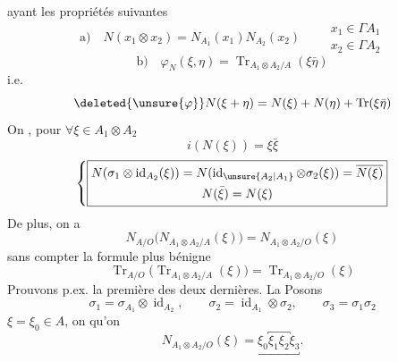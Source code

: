 ayant les propriétés suivantes
\[
\text{a)}\quad N(x_1\otimes x_2)=N_{A_1}(x_1)N_{A_2}(x_2)
\qquad\begin{gathered}x_1\in\Gamma A_1\\x_2\in\Gamma A_2\end{gathered}
\]
\[
\text{b)}\quad \varphi_N(\xi,\eta)=\operatorname{Tr}_{A_1\otimes A_2/A}(\xi\bar\eta)
\]
i.e.
\[
 \deleted{\unsure{\varphi}}N(\xi+\eta)=N(\xi)+N(\eta)+\operatorname{Tr}(\xi\bar\eta)
\]
On , pour $\forall\xi\in A_1\otimes A_2$
\[
 \boxed{i(N(\xi))=\xi\bar\xi}
\]
\[
\left\{\boxed{\begin{gathered}
 N(\sigma_1\otimes\operatorname{id}_{A_2}(\xi))=N(\operatorname{id}_{\unsure{A_2|A_1}}\otimes\sigma_2(\xi))=\overline{N(\xi)}\\
 N(\bar\xi)=N(\xi)
\end{gathered}}\right.
\]
De plus, on a
\[
 \boxed{N_{A/O}\bigl(N_{A_1\otimes A_2/A}(\xi)\bigr)=N_{A_1\otimes A_2/O}(\xi)}
\]
sans compter la formule plus bénigne
\[
 \boxed{\operatorname{Tr}_{A/O}\bigl(\operatorname{Tr}_{A_1\otimes A_2/A}(\xi)\bigr)=\operatorname{Tr}_{A_1\otimes A_2/O}(\xi)}
\]
Prouvons p.ex. la première des deux dernières. La 
Posons
\[
 \sigma_1=\sigma_{A_1}\otimes\operatorname{id}_{A_2},\qquad
 \sigma_2=\operatorname{id}_{A_1}\otimes\sigma_2,
 \qquad\sigma_3=\sigma_1\sigma_2
\]
\deleted{\unsure{\xi}} $\xi=\xi_0\in A$, 
on  qu'on 
\[
 N_{A_1\otimes A_2/O}(\xi)=\underbracket{\xi_0\overbracket{\xi_1\xi_2}\xi_3}.
\]
